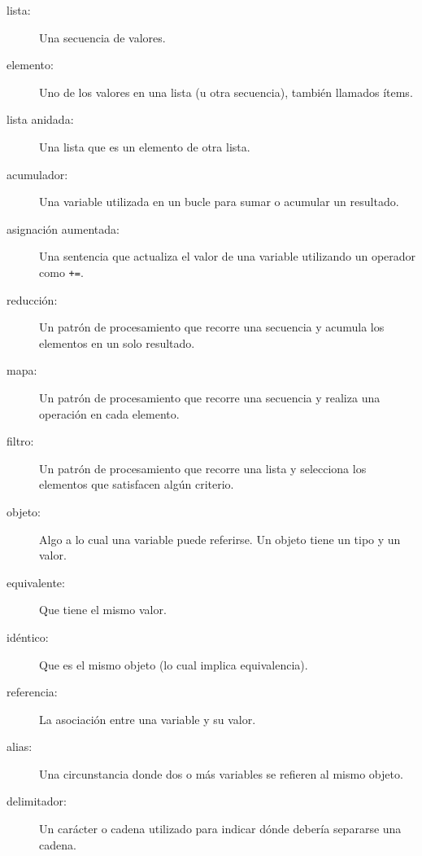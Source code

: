 \documentclass[10pt]{book}
\begin{document}
\begin{description}

\item[lista:] Una secuencia de valores.

\item[elemento:] Uno de los valores en una lista (u otra secuencia),
también llamados ítems.

\item[lista anidada:] Una lista que es un elemento de otra lista.

\item[acumulador:] Una variable utilizada en un bucle para sumar o
acumular un resultado.

\item[asignación aumentada:] Una sentencia que actualiza el valor
de una variable utilizando un operador como \verb"+=".

\item[reducción:] Un patrón de procesamiento que recorre una secuencia
y acumula los elementos en un solo resultado.

\item[mapa:] Un patrón de procesamiento que recorre una secuencia y
realiza una operación en cada elemento.

\item[filtro:] Un patrón de procesamiento que recorre una lista y
selecciona los elementos que satisfacen algún criterio.

\item[objeto:] Algo a lo cual una variable puede referirse.  Un objeto
tiene un tipo y un valor.

\item[equivalente:] Que tiene el mismo valor.

\item[idéntico:] Que es el mismo objeto (lo cual implica equivalencia).

\item[referencia:] La asociación entre una variable y su valor.

\item[alias:] Una circunstancia donde dos o más variables se refieren al mismo
objeto.

\item[delimitador:] Un carácter o cadena utilizado para indicar dónde
debería separarse una cadena.

\end{description}
\end{document}
